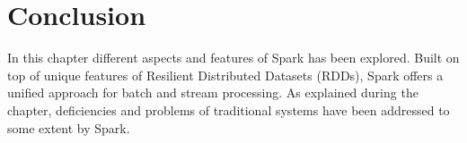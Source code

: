 \section{Conclusion}
\label{sp:conc}

In this chapter different aspects and features of Spark has been explored. Built on top of unique features of Resilient Distributed Datasets (RDDs), Spark offers a unified approach for batch and stream processing. As explained during the chapter, deficiencies and problems of traditional systems have been addressed to some extent by Spark.